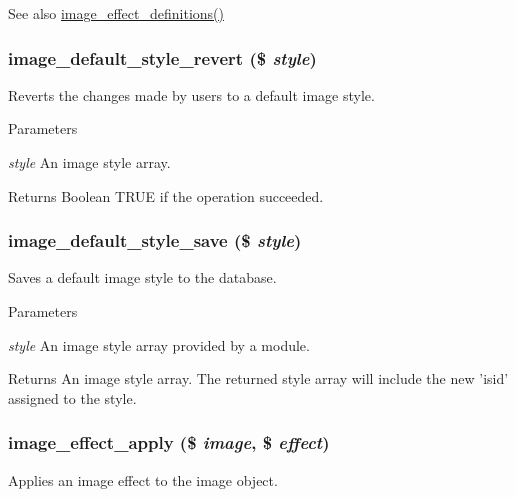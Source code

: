 \begin{DoxySeeAlso}{See also}
\hyperlink{image_8module_a8b4b01544349854c77bad8727d52f7d1}{image\_\-effect\_\-definitions()} 
\end{DoxySeeAlso}
\hypertarget{image_8module_af8b1ed6a3a3ac9e694c06f852075172e}{
\subsubsection[{image\_\-default\_\-style\_\-revert}]{\setlength{\rightskip}{0pt plus 5cm}image\_\-default\_\-style\_\-revert (\$ {\em style})}}
\label{image_8module_af8b1ed6a3a3ac9e694c06f852075172e}
Reverts the changes made by users to a default image style.


\begin{DoxyParams}{Parameters}
\item[{\em style}]An image style array. \end{DoxyParams}
\begin{DoxyReturn}{Returns}
Boolean TRUE if the operation succeeded. 
\end{DoxyReturn}
\hypertarget{image_8module_a6070f04fce978050d271f4777bc10bea}{
\subsubsection[{image\_\-default\_\-style\_\-save}]{\setlength{\rightskip}{0pt plus 5cm}image\_\-default\_\-style\_\-save (\$ {\em style})}}
\label{image_8module_a6070f04fce978050d271f4777bc10bea}
Saves a default image style to the database.


\begin{DoxyParams}{Parameters}
\item[{\em style}]An image style array provided by a module.\end{DoxyParams}
\begin{DoxyReturn}{Returns}
An image style array. The returned style array will include the new 'isid' assigned to the style. 
\end{DoxyReturn}
\hypertarget{image_8module_a94560c78e1736e12dcc85fd2f16b5d3a}{
\subsubsection[{image\_\-effect\_\-apply}]{\setlength{\rightskip}{0pt plus 5cm}image\_\-effect\_\-apply (\$ {\em image}, \/  \$ {\em effect})}}
\label{image_8module_a94560c78e1736e12dcc85fd2f16b5d3a}
Applies an image effect to the image object.


